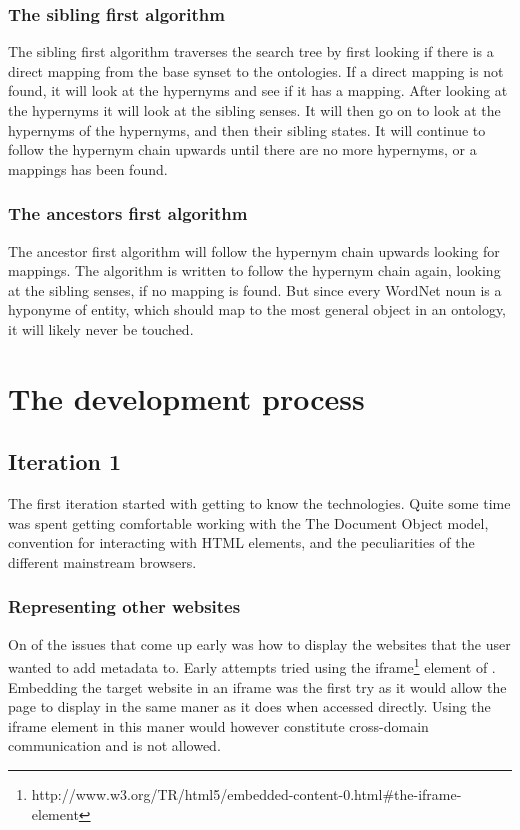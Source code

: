 \subsubsection{The sibling first algorithm}
The sibling first algorithm traverses the search tree by first looking if there is a direct mapping from the base synset to the ontologies.
If a direct mapping is not found, it will look at the hypernyms and see if it has a mapping.
After looking at the hypernyms it will look at the sibling senses.
It will then go on to look at the hypernyms of the hypernyms, and then their sibling states.
It will continue to follow the hypernym chain upwards until there are no more hypernyms, or a mappings has been found.

\subsubsection{The ancestors first algorithm}
The ancestor first algorithm will follow the hypernym chain upwards looking for mappings.
The algorithm is written to follow the hypernym chain again, looking at the sibling senses, if no mapping is found.
But since every WordNet noun is a hyponyme of {entity}, which should map to the most general object in an ontology,
it will likely never be touched.



\section{The development process}


\subsection{Iteration 1}
The first iteration started with getting to know the technologies.
Quite some time was spent getting comfortable working with the 
{The Document Object model, convention for interacting with HTML elements},
and the peculiarities of the different mainstream browsers.

\subsubsection{Representing other websites}
On of the issues that come up early was how to display the websites that the user wanted to add metadata to.
Early attempts tried using the iframe\footnote{http://www.w3.org/TR/html5/embedded-content-0.html\#the-iframe-element}
element of .
Embedding the target website in an iframe was the first try as it would allow the page to display in the same maner
as it does when accessed directly.
Using the iframe element in this maner would however constitute cross-domain communication and is not allowed.

